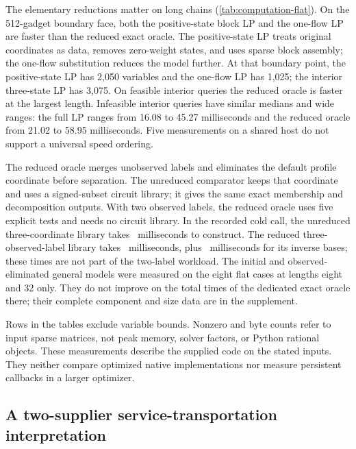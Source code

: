 

The elementary reductions matter on long chains
(\cref{tab:computation-flat}). On the 512-gadget boundary face, both
the positive-state block LP and the one-flow LP are faster than the reduced
exact oracle. The positive-state LP treats original coordinates as data,
removes zero-weight states, and uses sparse block assembly; the one-flow
substitution reduces the model further. At that boundary point,
the positive-state LP has 2,050 variables and the one-flow LP has 1,025;
the interior three-state LP has 3,075.
On feasible interior queries the reduced oracle is faster at the largest
length. Infeasible interior queries have similar medians and wide ranges:
the full LP ranges from 16.08 to 45.27 milliseconds and the reduced oracle
from 21.02 to 58.95 milliseconds. Five measurements on a shared host do
not support a universal speed ordering.

The reduced oracle merges unobserved labels and eliminates the default
profile coordinate before separation. The unreduced comparator keeps
that coordinate and uses a signed-subset circuit library; it gives the
same exact membership and decomposition outputs. With two observed labels,
the reduced oracle uses five explicit tests and needs no circuit library.
In the recorded cold call, the unreduced three-coordinate library takes
\BenchOldCold\ milliseconds to construct. The reduced three-observed-label
library takes \BenchNewThreeCold\ milliseconds, plus
\BenchNewThreeBases\ milliseconds for its inverse bases; these times are
not part of the two-label workload. The initial and observed-eliminated
general models were measured on the eight flat cases at lengths eight
and 32 only. They do not improve on the total times of the dedicated exact
oracle there; their complete component and size data are in the
supplement.

Rows in the tables exclude variable bounds. Nonzero and byte counts refer
to input sparse matrices, not peak memory, solver factors, or Python rational
objects. These measurements describe the supplied code on the stated
inputs. They neither compare optimized native implementations nor measure
persistent callbacks in a larger optimizer.

\subsection{A two-supplier service-transportation interpretation}

